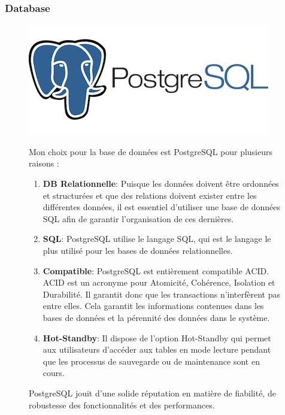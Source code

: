 \subsubsection{Database}

\begin{figure}[H]
  \begin{minipage}{.3\textwidth}
    \includegraphics[width=0.75\linewidth]{img/PostgreSql.png} 
  \end{minipage} 
  \begin{minipage}{.7\textwidth}
    Mon choix pour la base de données est PostgreSQL pour plusieurs raisons :
    \begin{enumerate}
      \item \textbf{DB Relationnelle}: Puisque les données doivent être ordonnées et structurées et que des relations doivent exister entre les différentes données, il est essentiel d'utiliser une base de données SQL afin de garantir l'organisation de ces dernières.
      \item \textbf{SQL}: PostgreSQL utilise le langage SQL, qui est le langage le plus utilisé pour les bases de données relationnelles.
      \item \textbf{Compatible}: PostgreSQL est entièrement compatible ACID. ACID est un acronyme pour Atomicité, Cohérence, Isolation et Durabilité. Il garantit donc que les transactions n'interfèrent pas entre elles. Cela garantit les informations contenues dans les bases de données et la pérennité des données dans le système.
      \item \textbf{Hot-Standby}: Il dispose de l'option Hot-Standby qui permet aux utilisateurs d'accéder aux tables en mode lecture pendant que les processus de sauvegarde ou de maintenance sont en cours.

    \end{enumerate}
    PostgreSQL jouit d'une solide réputation en matière de fiabilité, de robustesse des fonctionnalités et des performances.
  \end{minipage} 
\end{figure}


